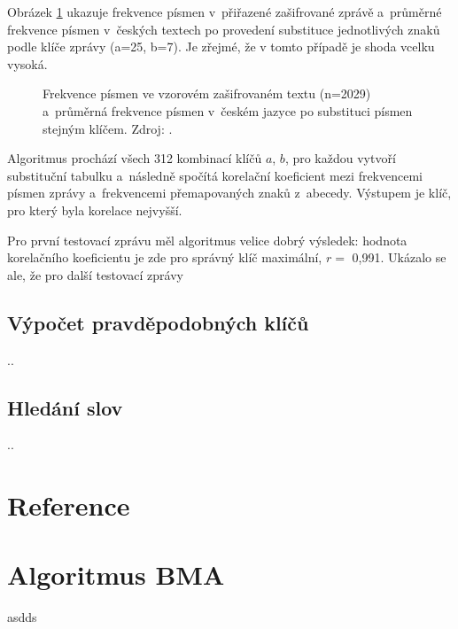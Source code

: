 \documentclass[11pt]{article}
\begin{document}
Obrázek \ref{fig:korelacni} ukazuje frekvence písmen v~přiřazené zašifrované zprávě a~průměrné frekvence písmen v~českých textech po provedení substituce jednotlivých znaků podle klíče zprávy (a=25, b=7). Je zřejmé, že v tomto případě je shoda vcelku vysoká.

\begin{figure}[ht]
    \centering
    
    
    \vspace{\baselineskip}

    

    \caption{Frekvence písmen ve vzorovém zašifrovaném textu (n=2029) a~průměrná frekvence písmen v~českém jazyce po substituci písmen stejným klíčem. Zdroj: \cite{matweb:frekv}.}
    \label{fig:korelacni}
\end{figure}

Algoritmus prochází všech 312 kombinací klíčů $a$, $b$, pro každou vytvoří substituční tabulku a~následně spočítá korelační koeficient mezi frekvencemi písmen zprávy a~frekvencemi přemapovaných znaků z~abecedy. Výstupem je klíč, pro který byla korelace nejvyšší.

Pro první testovací zprávu měl algoritmus velice dobrý výsledek: hodnota korelačního koeficientu je zde pro správný klíč maximální, $r = $ 0,991. Ukázalo se ale, že pro další testovací zprávy 

\subsection{Výpočet pravděpodobných klíčů}

..

\subsection{Hledání slov}

..

\clearpage
\section*{Reference}
\printbibliography[heading=none]

\clearpage
\appendix
\appendixpage

\section{Algoritmus BMA}
asdds
\end{document}
